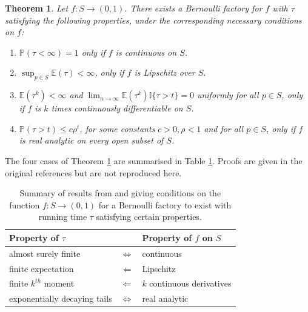 \documentclass{article}
\newtheorem{thm}{Theorem}
\theoremstyle{definition}
\newcommand{\PR}{\mathbb{P}}
\newcommand{\E}{\mathbb{E}}
\begin{document}
\begin{thm}\label{thm:nacu_peres}
Let $f:S\to(0,1)$. 
There exists a Bernoulli factory for $f$ with $\tau$ satisfying the following properties, under the corresponding necessary conditions on $f$:
\begin{enumerate}[label=(\alph*)]
\item \label{thm:nplike_terminates_as} \textup{\citep{keane1994}} $\PR(\tau <\infty)=1$ only if $f$ is continuous on $S$.
\item \label{thm:np_finite_mean} \textup{\citep[Proposition 23]{nacu2005}} $\sup_{p\in S} \E(\tau) <\infty$, only if $f$ is Lipschitz over $S$. 
\item \label{thm:np_kth_moment} \textup{\citep[Proposition 22]{nacu2005}} $\E(\tau ^k)<\infty$ and $\lim_{n\to\infty} \E(\tau^k)\mathbb{I}\{\tau>t\} =0$ uniformly for all $p\in S$, only if $f$ is $k$ times continuously differentiable on $S$.
\item \label{thm:np_exponential_tails} \textup{\citep[Theorem 2]{nacu2005}} $\PR(\tau >t) \leq c\rho^t$, for some constants $c>0, \rho<1$ and for all $p\in S$, only if $f$ is real analytic on every open subset of $S$. %
\end{enumerate}
\end{thm}
The four cases of Theorem \ref{thm:nacu_peres} are summarised in Table \ref{tab:theorems_summary}. Proofs are given in the original references but are not reproduced here.

\begin{table}
\centering
\begin{tabular}{l c l}
Property of $\tau$ & & Property of $f$ on $S$ \\
\hline
almost surely finite & $\Leftrightarrow$ & continuous \\
finite expectation & $\Leftarrow$ & Lipschitz \\
finite $k^{th}$ moment & $\Leftarrow$ & $k$ continuous derivatives \\
exponentially decaying tails & $\Leftrightarrow$ & real analytic
\end{tabular}
\caption{Summary of results from \citet{keane1994} and \citet{nacu2005} giving conditions on the function $f:S\to(0,1)$ for a Bernoulli factory to exist with running time $\tau$ satisfying certain properties.}
\label{tab:theorems_summary}
\end{table}
\end{document}

